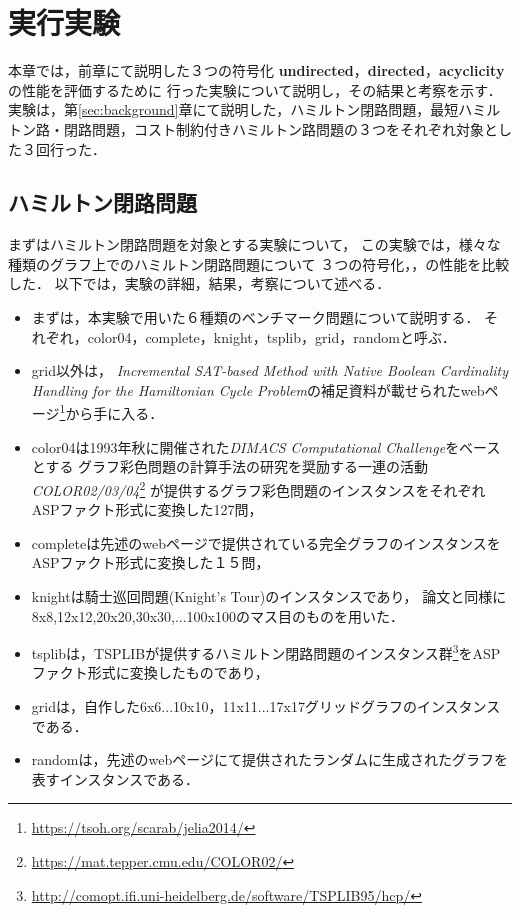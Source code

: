 \chapter{実行実験}\label{chap:experiment}
本章では，前章にて説明した３つの符号化
\textbf{undirected}，\textbf{directed}，\textbf{acyclicity}
の性能を評価するために
行った実験について説明し，その結果と考察を示す．
実験は，第\ref{sec:background}章にて説明した，ハミルトン閉路問題，最短ハミルトン路・閉路問題，コスト制約付きハミルトン路問題の３つをそれぞれ対象とした３回行った．
\section{ハミルトン閉路問題}
まずはハミルトン閉路問題を対象とする実験について，
この実験では，様々な種類のグラフ上でのハミルトン閉路問題について
３つの符号化，，の性能を比較した．
以下では，実験の詳細，結果，考察について述べる．

\begin{itemize}
\item まずは，本実験で用いた６種類のベンチマーク問題について説明する．
それぞれ，color04，complete，knight，tsplib，grid，randomと呼ぶ．
\item grid以外は，
\textit{Incremental SAT-based Method with Native Boolean Cardinality Handling for the Hamiltonian Cycle Problem}\cite{soh14}の補足資料が載せられたwebページ\footnote{\url{https://tsoh.org/scarab/jelia2014/}}から手に入る．

\item color04は1993年秋に開催された\textit{DIMACS Computational Challenge}をベースとする
グラフ彩色問題の計算手法の研究を奨励する一連の活動
\textit{COLOR02/03/04}\footnote{\url{https://mat.tepper.cmu.edu/COLOR02/}}
が提供するグラフ彩色問題のインスタンスをそれぞれASPファクト形式に変換した127問，
\item completeは先述のwebページ\footnotemark[1]で提供されている完全グラフのインスタンスをASPファクト形式に変換した１５問，
\item knightは騎士巡回問題(Knight's Tour)のインスタンスであり，
論文\cite{soh14}と同様に8x8,12x12,20x20,30x30,...100x100のマス目のものを用いた．
\item tsplibは，TSPLIBが提供するハミルトン閉路問題のインスタンス群\footnote{\url{http://comopt.ifi.uni-heidelberg.de/software/TSPLIB95/hcp/}}をASPファクト形式に変換したものであり，
\item gridは，自作した6x6...10x10，11x11...17x17グリッドグラフのインスタンスである．
\item randomは，先述のwebページ\footnotemark[1]にて提供されたランダムに生成されたグラフを表すインスタンスである．
\end{itemize}

